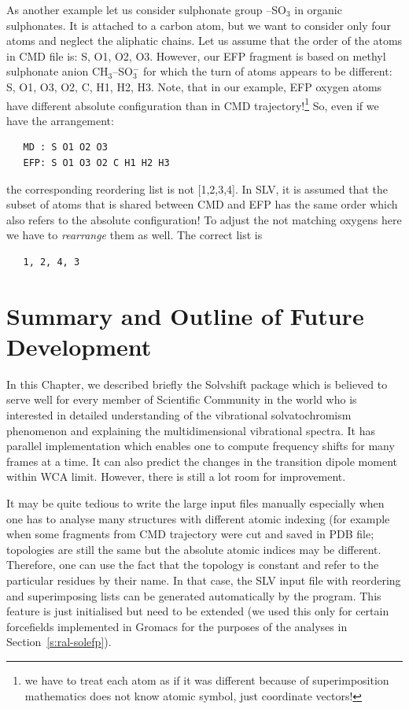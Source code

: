 \documentclass[a4paper,titlepage,twoside,fleqn,12pt]{book}
\begin{document}
\begin{refsection}
As another example let us consider sulphonate group --SO$_3$
in organic sulphonates. It is attached to a carbon atom, but we want to consider only four atoms
and neglect the aliphatic chains. 
Let us assume that the order of the atoms in CMD file is: 
S, O1, O2, O3. However, our EFP fragment is based on methyl sulphonate anion CH$_3$--SO$_3^-$
for which the turn of atoms appears to be different: S, O1, O3, O2, C, H1, H2, H3. Note, that in our
example, EFP oxygen atoms have different absolute configuration than in CMD trajectory!\footnote{we have to treat
each atom as if it was different because of superimposition mathematics does not know atomic symbol,
just coordinate vectors!} So, even if we have the arrangement:
%
\begin{verbatim}
   MD : S O1 O2 O3
   EFP: S O1 O3 O2 C H1 H2 H3
\end{verbatim}
%
the corresponding reordering list is not [1,2,3,4]. In SLV, it is assumed
that the subset of atoms that is shared between CMD and EFP has the same order which also refers to the
absolute configuration! To adjust the not matching oxygens here we have to \emph{rearrange}
them as well. The correct list is
%
\begin{verbatim}
   1, 2, 4, 3
\end{verbatim}
%


\section{Summary and Outline of Future Development}

In this Chapter, we described briefly the {\sc Solvshift} package
which is believed to serve well for every member of Scientific Community
in the world who is interested in detailed understanding of the
vibrational solvatochromism phenomenon and explaining
the multidimensional vibrational spectra. It has parallel 
implementation which enables one to compute frequency shifts
for many frames at a time. It can also predict the changes in the
transition dipole moment within WCA limit. However, there is still a lot room for improvement.

It may be quite tedious to write the large input files manually especially when one has to analyse many
structures with different atomic indexing (for example when some fragments from CMD trajectory were
cut and saved in PDB file; topologies are still the same but the absolute atomic indices may be different.
Therefore, one can use the fact that the topology is constant and refer to the particular residues by their
name. In that case, the SLV input file with reordering and superimposing lists can be generated
automatically by the program. This feature is just initialised but need to be extended (we used
this only for certain forcefields implemented in {\sc Gromacs} for the purposes
of the analyses in Section~\ref{s:ral-solefp}).


\end{refsection}
\end{document}
